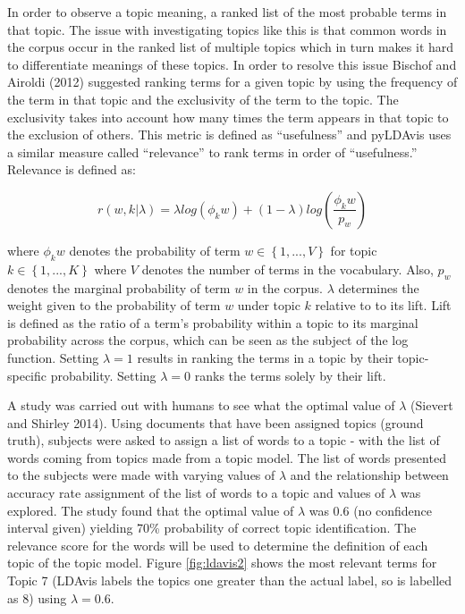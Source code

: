 \documentclass[
]{article}
\begin{document}
In order to observe a topic meaning, a ranked list of the most probable
terms in that topic. The issue with investigating topics like this is
that common words in the corpus occur in the ranked list of multiple
topics which in turn makes it hard to differentiate meanings of these
topics. In order to resolve this issue Bischof and Airoldi (2012)
suggested ranking terms for a given topic by using the frequency of the
term in that topic and the exclusivity of the term to the topic. The
exclusivity takes into account how many times the term appears in that
topic to the exclusion of others. This metric is defined as
``usefulness'' and pyLDAvis uses a similar measure called ``relevance''
to rank terms in order of ``usefulness.'' Relevance is defined as:

\begin{equation}
r(w,k|\lambda)=\lambda log(\phi_kw) + (1-\lambda)log(\frac{\phi_kw}{p_w})
\end{equation}

where \(\phi_kw\) denotes the probability of term
\(w\in \left \{ 1,...,V \right \}\) for topic
\(k\in \left \{ 1,...,K \right \}\) where \(V\) denotes the number of
terms in the vocabulary. Also, \(p_w\) denotes the marginal probability
of term \(w\) in the corpus. \(\lambda\) determines the weight given to
the probability of term \(w\) under topic \(k\) relative to to its lift.
Lift is defined as the ratio of a term's probability within a topic to
its marginal probability across the corpus, which can be seen as the
subject of the log function. Setting \(\lambda =1\) results in ranking
the terms in a topic by their topic-specific probability. Setting
\(\lambda=0\) ranks the terms solely by their lift.

A study was carried out with humans to see what the optimal value of
\(\lambda\) (Sievert and Shirley 2014). Using documents that have been
assigned topics (ground truth), subjects were asked to assign a list of
words to a topic - with the list of words coming from topics made from a
topic model. The list of words presented to the subjects were made with
varying values of \(\lambda\) and the relationship between accuracy rate
assignment of the list of words to a topic and values of \(\lambda\) was
explored. The study found that the optimal value of \(\lambda\) was 0.6
(no confidence interval given) yielding 70\% probability of correct
topic identification. The relevance score for the words will be used to
determine the definition of each topic of the topic model. Figure
\ref{fig:ldavis2} shows the most relevant terms for Topic 7 (LDAvis
labels the topics one greater than the actual label, so is labelled as
8) using \(\lambda =0.6\).
\end{document}
